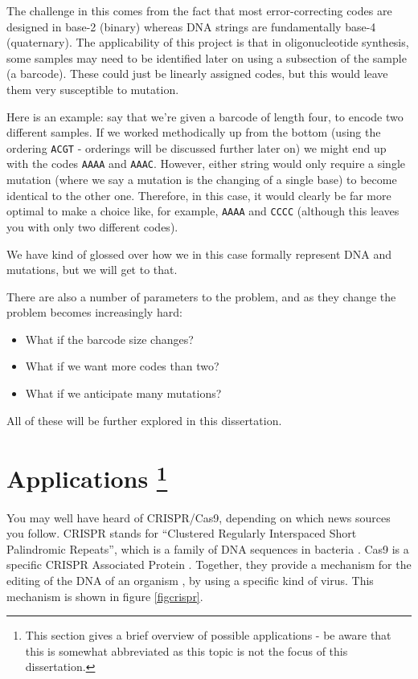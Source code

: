\documentclass[a4paper,11pt]{article}
\begin{document}
    The challenge in this comes from the fact that most error-correcting codes
    are designed in base-2 (binary) whereas DNA strings are fundamentally
    base-4 (quaternary). The applicability of this project is that in
    oligonucleotide synthesis, some samples may need to be identified later on
    using a subsection of the sample (a barcode). These could just be linearly
    assigned codes, but this would leave them very susceptible to mutation.

    Here is an example: say that we're given a barcode of length four, to encode
    two different samples. If we worked methodically up from the bottom (using
    the ordering \texttt{ACGT} - orderings will be discussed further later on)
    we might end up with the codes \texttt{AAAA} and \texttt{AAAC}. However,
    either string would only require a single mutation (where we say a mutation
    is the changing of a single base) to become identical to the other one.
    Therefore, in this case, it would clearly be far more optimal to make a
    choice like, for example, \texttt{AAAA} and \texttt{CCCC} (although this
    leaves you with only two different codes).

    We have kind of glossed over how we in this case formally represent DNA and
    mutations, but we will get to that.

    There are also a number of parameters to the problem, and as they change
    the problem becomes increasingly hard:

    \begin{itemize}
    \item What if the barcode size changes?
    \item What if we want more codes than two?
    \item What if we anticipate many mutations?
    \end{itemize}

    All of these will be further explored in this dissertation.

    \section[Applications]{Applications \footnote{This section gives a brief
    overview of possible applications - be aware that this is somewhat
    abbreviated as this topic is not the focus of this dissertation.}}

    You may well have heard of CRISPR/Cas9, depending on which news sources you
    follow. CRISPR stands for ``Clustered Regularly Interspaced Short
    Palindromic Repeats'', which is a family of DNA sequences in bacteria
    \cite{CRISPRDailyMail,CRISPRImmune2010Horvath,WikiCrispr}. Cas9 is a
    specific CRISPR Associated Protein \cite{WikiCas9}. Together, they provide a
    mechanism for the editing of the DNA of an organism
    \cite{CRISPER2016Finneran}, by using a specific kind of virus.  This
    mechanism is shown in figure \ref{figcrispr}.
\end{document}
